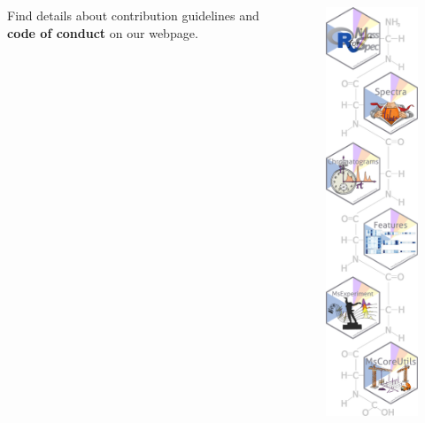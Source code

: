 \documentclass[final]{beamer}
\begin{document}
\begin{frame}[fragile]
\begin{columns}[T]
\begin{column}{.3\textwidth}
{        Find details about contribution guidelines and \textbf{code of
          conduct} on our webpage.

      }

    \end{column}

    \begin{column}{.2\textwidth}
          \begin{figure}
            \centering
            \includegraphics[width=1\linewidth]{./figs/pkgs.pdf}
          \end{figure}


\end{column}
\end{columns}
\end{frame}
\end{document}
